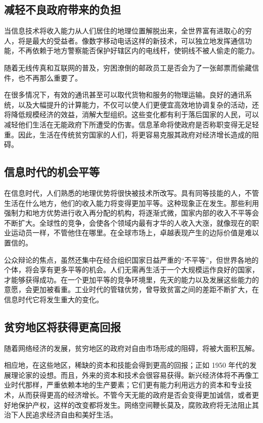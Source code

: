 \subsection{减轻不良政府带来的负担}
当信息技术将收入能力从人们居住的地理位置解脱出来，全世界富有进取心的穷人，将是最大的受益者。像数字移动电话这样的新技术，可以独立地发挥通信功能，不再依赖于地方警察能否保护好辖区内的电线杆，使铜线不被人偷走的能力。

随着无线传真和互联网的普及，穷困潦倒的邮政员工是否会为了一张邮票而偷藏信件，也不再那么重要了。

在很多情况下，有效的通讯甚至可以取代货物和服务的物理运输。良好的通讯系统，以及大幅提升的计算能力，不仅可以使人们更便宜高效地协调复杂的活动，还将降低规模经济的效益，消解大型组织。这些变化都有利于落后国家的人民，可以减轻他们生活在无能政府下所遭受的伤害。信息革命将使政府是否称职变得无足轻重。因此，生活在传统贫穷国家的人们，将更容易克服其政府对经济增长造成的阻碍。

\subsection{信息时代的机会平等}
在信息时代，人们熟悉的地理优势将很快被技术所改写。具有同等技能的人，不管生活在什么地方，他们的收入能力将变得更加平等。这种现象正在发生。那些利用强制力和地方优势进行收入再分配的机构，将逐渐式微，国家内部的收入不平等会不断扩大。全球性的竞争，会使各个领域内最有才华的人收入大涨，就像现在的职业运动员一样，不管他住在哪里。在全球市场上，卓越表现产生的边际价值是难以置信的。

公众辩论的焦点，虽然还集中在经合组织国家日益严重的“不平等”，但世界各地的个体，将会享有更多平等的机会。人们无需再生活于一个大规模运作良好的国家，才能够获得成功。在一个更加平等的竞争环境里，先天的能力以及发展这些能力的意愿，会更加被看重。工业时代的管辖优势，曾导致贫富之间的差距不断扩大，在信息时代它将发生重大的变化。

\subsection{贫穷地区将获得更高回报}
随着网络经济的发展，贫穷地区的政府对自由市场形成的阻碍，将被大面积瓦解。

相应地，在这些地区，稀缺的资本和技能会得到更高的回报；正如 1950 年代的发展理论家的设想。而且，外来的资本和技术会很容易获得。新兴经济体将不再像工业时代那样，严重依赖本地的生产要素；它们更有能力利用远方的资本和专业技术，从而获得更高的经济增长。不管今天无能的政府是否会变得更加诚信，或者更好地保护产权，这样的改变都将发生。网络空间鞭长莫及，腐败政府将无法阻止其治下人民追求经济自由和美好生活。

